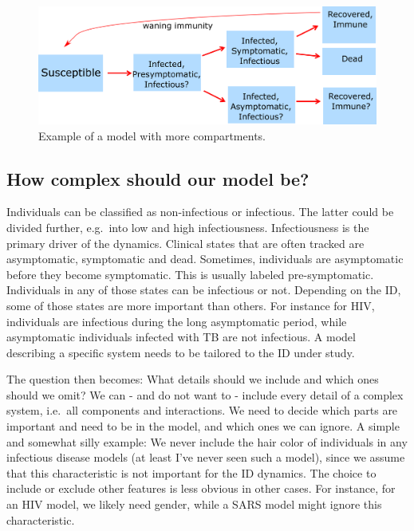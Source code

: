 \documentclass[]{article}
\theoremstyle{definition}
\theoremstyle{definition}
\theoremstyle{definition}
\theoremstyle{remark}
\begin{document}
\begin{figure}
\centering
\includegraphics{./images/ComplicatedModel.png}
\caption{\label{fig:complicatedmodel}Example of a model with more
compartments.}
\end{figure}

\subsection{How complex should our model
be?}\label{how-complex-should-our-model-be}

Individuals can be classified as non-infectious or infectious. The
latter could be divided further, e.g.~into low and high infectiousness.
Infectiousness is the primary driver of the dynamics. Clinical states
that are often tracked are asymptomatic, symptomatic and dead.
Sometimes, individuals are asymptomatic before they become symptomatic.
This is usually labeled pre-symptomatic. Individuals in any of those
states can be infectious or not. Depending on the ID, some of those
states are more important than others. For instance for HIV, individuals
are infectious during the long asymptomatic period, while asymptomatic
individuals infected with TB are not infectious. A model describing a
specific system needs to be tailored to the ID under study.

The question then becomes: What details should we include and which ones
should we omit? We can - and do not want to - include every detail of a
complex system, i.e.~all components and interactions. We need to decide
which parts are important and need to be in the model, and which ones we
can ignore. A simple and somewhat silly example: We never include the
hair color of individuals in any infectious disease models (at least
I've never seen such a model), since we assume that this characteristic
is not important for the ID dynamics. The choice to include or exclude
other features is less obvious in other cases. For instance, for an HIV
model, we likely need gender, while a SARS model might ignore this
characteristic.
\end{document}

